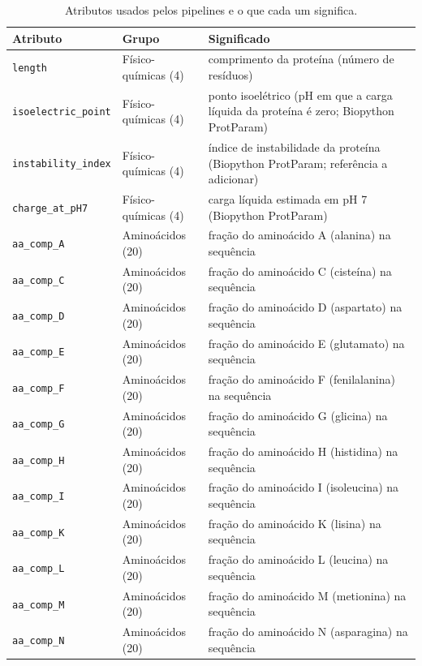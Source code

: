 \begin{longtable}{p{4.2cm}p{2.6cm}p{8cm}}
  \caption{Atributos usados pelos pipelines e o que cada um significa.}\label{tab:dicionario_atributos} \\
  \toprule
  Atributo & Grupo & Significado \\
  \midrule
  \endhead
  \texttt{length} & Físico-químicas (4) & comprimento da proteína (número de resíduos) \\
  \texttt{isoelectric\_point} & Físico-químicas (4) & ponto isoelétrico (pH em que a carga líquida da proteína é zero; Biopython ProtParam) \\
  \texttt{instability\_index} & Físico-químicas (4) & índice de instabilidade da proteína (Biopython ProtParam; referência a adicionar) \\
  \texttt{charge\_at\_pH7} & Físico-químicas (4) & carga líquida estimada em pH 7 (Biopython ProtParam) \\
  \texttt{aa\_comp\_A} & Aminoácidos (20) & fração do aminoácido A (alanina) na sequência \\
  \texttt{aa\_comp\_C} & Aminoácidos (20) & fração do aminoácido C (cisteína) na sequência \\
  \texttt{aa\_comp\_D} & Aminoácidos (20) & fração do aminoácido D (aspartato) na sequência \\
  \texttt{aa\_comp\_E} & Aminoácidos (20) & fração do aminoácido E (glutamato) na sequência \\
  \texttt{aa\_comp\_F} & Aminoácidos (20) & fração do aminoácido F (fenilalanina) na sequência \\
  \texttt{aa\_comp\_G} & Aminoácidos (20) & fração do aminoácido G (glicina) na sequência \\
  \texttt{aa\_comp\_H} & Aminoácidos (20) & fração do aminoácido H (histidina) na sequência \\
  \texttt{aa\_comp\_I} & Aminoácidos (20) & fração do aminoácido I (isoleucina) na sequência \\
  \texttt{aa\_comp\_K} & Aminoácidos (20) & fração do aminoácido K (lisina) na sequência \\
  \texttt{aa\_comp\_L} & Aminoácidos (20) & fração do aminoácido L (leucina) na sequência \\
  \texttt{aa\_comp\_M} & Aminoácidos (20) & fração do aminoácido M (metionina) na sequência \\
  \texttt{aa\_comp\_N} & Aminoácidos (20) & fração do aminoácido N (asparagina) na sequência \\

\end{longtable}
